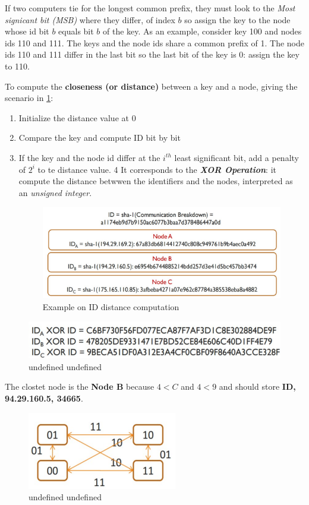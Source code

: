 \documentclass[10pt,a4paper]{report}
\begin{document}
If two computers tie for the longest common prefix, they must look to the \textit{Most signicant bit (MSB)} where they differ, of index $b$ so assign the key to the node whose id bit $b$ equals bit $b$ of the key.
As an example, consider key 100 and nodes ids 110 and 111. The keys and the node ids share a common prefix of 1. The node ids 110 and 111 differ in the last bit so the last bit of the key is 0: assign the key to 110.

To compute the \textbf{closeness (or distance)} between a key and a node, giving the scenario in \ref{example-distance}:
\begin{enumerate}
	\item 
	Initialize the distance value at 0
	\item 
	Compare the key and compute ID bit by bit
	\item 
	If the key and the node id differ at the $i^{th}$ least significant bit, add a penalty of $2^{i}$ to te distance value.
	4
	It corresponds to the \textit{\textbf{XOR Operation}}: it compute the distance betwwen the identifiers and the nodes, interpreted as an \textit{unsigned integer}.
	\begin{figure}[h!]
		\centering
		\includegraphics[scale=0.60]{images/Pasted image 20230303144637.png}
		\caption{Example on ID distance computation}
		\label{example-distance}	
\end{figure}
	
\end{enumerate}

\begin{figure}
	\includegraphics[scale=0.60]{images/Pasted image 20230303144852.png}
	\caption{undefined undefined}\end{figure}

The clostet node is the \textbf{Node B} because  $4 < C$ and $4 < 9$ and should store \textbf{ID, 94.29.160.5,  34665}.
\begin{figure}
	\centering
	\includegraphics[scale=0.60]{images/Pasted image 20230304104122.png}
	\caption{undefined undefined}
 	\label{}
\end{figure}
\end{document}
